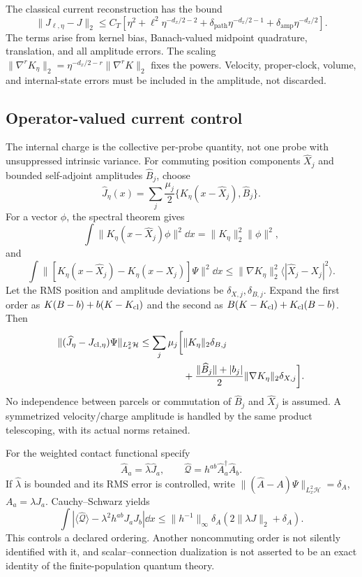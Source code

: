 \documentclass[11pt]{article}
\begin{document}
The classical current reconstruction has the bound
\begin{equation}\label{eq:classcurrent}
\|J_{\ell,\eta}-J\|_2
\le C_T\left[
\eta^2+\ell^2\eta^{-d_x/2-2}
+\delta_{\mathrm{path}}\eta^{-d_x/2-1}
+\delta_{\mathrm{amp}}\eta^{-d_x/2}\right].
\end{equation}
The terms arise from kernel bias, Banach-valued midpoint quadrature, translation, and all amplitude errors. The scaling
$\|\nabla^rK_\eta\|_2=\eta^{-d_x/2-r}\|\nabla^rK\|_2$
fixes the powers. Velocity, proper-clock, volume, and internal-state errors must be included in the amplitude, not discarded.

\subsection{Operator-valued current control}
The internal charge is the collective per-probe quantity, not one probe with unsuppressed intrinsic variance. For commuting position components $\widehat X_j$ and bounded self-adjoint amplitudes $\widehat B_j$, choose
\[
\widehat J_\eta(x)=\sum_j\frac{\mu_j}{2}
\{K_\eta(x-\widehat X_j),\widehat B_j\}.
\]
For a vector $\phi$, the spectral theorem gives
\[
\int\|K_\eta(x-\widehat X_j)\phi\|^2\dd x
=\|K_\eta\|_2^2\|\phi\|^2,
\]
and
\[
\int\|[K_\eta(x-\widehat X_j)-K_\eta(x-X_j)]\Psi\|^2\dd x
\le\|\nabla K_\eta\|_2^2\langle|\widehat X_j-X_j|^2\rangle.
\]
Let the RMS position and amplitude deviations be $\delta_{X,j},\delta_{B,j}$. Expand the first order as $K(B-b)+b(K-K_{\rm cl})$ and the second as $B(K-K_{\rm cl})+K_{\rm cl}(B-b)$. Then
\begin{equation}\label{eq:quantcurrent}
\begin{split}
\|(\widehat J_\eta-J_{{\rm cl},\eta})\Psi\|_{L^2_x\mathcal H}
\le\sum_j\mu_j\bigg[
&\|K_\eta\|_2\delta_{B,j}\\
&+\frac{\|\widehat B_j\|+|b_j|}{2}
\|\nabla K_\eta\|_2\delta_{X,j}\bigg].
\end{split}
\end{equation}
No independence between parcels or commutation of $\widehat B_j$ and $\widehat X_j$ is assumed. A symmetrized velocity/charge amplitude is handled by the same product telescoping, with its actual norms retained.

For the weighted contact functional specify
\[
\widehat A_a=\widehat\lambda\widehat J_a,\qquad
\widehat{\mathcal Q}=h^{ab}\widehat A_a^\dagger\widehat A_b.
\]
If $\widehat\lambda$ is bounded and its RMS error is controlled, write
$\|(\widehat A-A)\Psi\|_{L^2_x\mathcal H}=\delta_A$,
$A_a=\lambda J_a$. Cauchy--Schwarz yields
\begin{equation}\label{eq:contact}
\boxed{\int\left|\langle\widehat{\mathcal Q}\rangle
-\lambda^2h^{ab}J_aJ_b\right|\dd x
\le\|h^{-1}\|_\infty\delta_A(2\|\lambda J\|_2+\delta_A).}
\end{equation}
This controls a declared ordering. Another noncommuting order is not silently identified with it, and scalar--connection dualization is not asserted to be an exact identity of the finite-population quantum theory.
\end{document}
